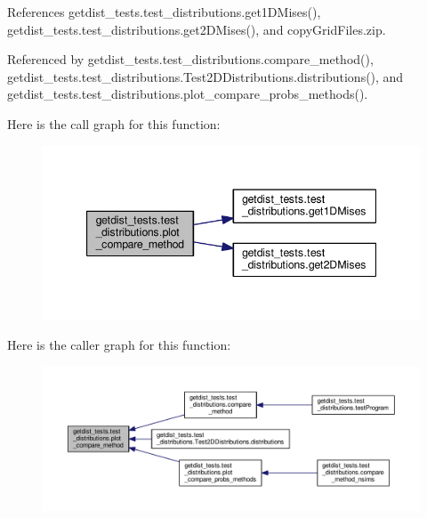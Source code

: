 References getdist\+\_\+tests.\+test\+\_\+distributions.\+get1\+D\+Mises(), getdist\+\_\+tests.\+test\+\_\+distributions.\+get2\+D\+Mises(), and copy\+Grid\+Files.\+zip.



Referenced by getdist\+\_\+tests.\+test\+\_\+distributions.\+compare\+\_\+method(), getdist\+\_\+tests.\+test\+\_\+distributions.\+Test2\+D\+Distributions.\+distributions(), and getdist\+\_\+tests.\+test\+\_\+distributions.\+plot\+\_\+compare\+\_\+probs\+\_\+methods().

Here is the call graph for this function\+:
\nopagebreak
\begin{figure}[H]
\begin{center}
\leavevmode
\includegraphics[width=344pt]{namespacegetdist__tests_1_1test__distributions_ad9e34543b241b9b5e67b066b1f94d997_cgraph}
\end{center}
\end{figure}
Here is the caller graph for this function\+:
\nopagebreak
\begin{figure}[H]
\begin{center}
\leavevmode
\includegraphics[width=350pt]{namespacegetdist__tests_1_1test__distributions_ad9e34543b241b9b5e67b066b1f94d997_icgraph}
\end{center}
\end{figure}
\mbox{\label{namespacegetdist__tests_1_1test__distributions_a39af2372626f003d30a4b041de34f700}} 
